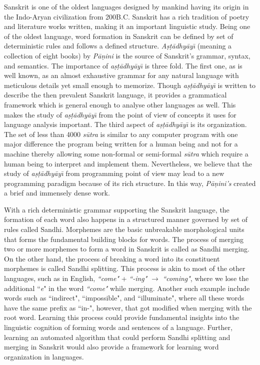 \documentclass[11pt]{article}
\begin{document}
Sanskrit is one of the oldest languages designed by mankind having its origin in the Indo-Aryan civilization from 200B.C. Sanskrit has a rich tradition of poetry and literature works written, making it an important linguistic study. Being one of the oldest language, word formation in Sanskrit can be defined by set of deterministic rules and follows a defined structure. \textit{A\d{s}\d{t}\={a}dhy\={a}y\={\i}} (meaning a collection of eight books) by \textit{P\={a}\d{n}ini} is the source of Sanskrit's grammar, syntax, and semantics. The importance of \textit{a\d{s}\d{t}\={a}dhy\={a}y\={\i}} is three fold\cite{bharati2007}. The first one, as is well known, as an almost exhaustive grammar for any natural language with meticulous details yet small enough to memorize. Though \textit{a\d{s}\d{t}\={a}dhy\={a}y\={\i}} is written to describe the then prevalent Sanskrit language, it provides a grammatical framework which is general enough to analyse other languages as well. This makes the study of \textit{a\d{s}\d{t}\={a}dhy\={a}y\={\i}} from the point of view of concepts it uses for language analysis important. The third aspect of \textit{a\d{s}\d{t}\={a}dhy\={a}y\={\i}} is its organization. The set of less than 4000 \textit{s\={u}tra} is similar to any computer program with one major difference the program being written for a human being and not for a machine thereby allowing some non-formal or semi-formal \textit{s\={u}tra} which require a human being to interpret and implement them. Nevertheless, we believe that the study of \textit{a\d{s}\d{t}\={a}dhy\={a}y\={\i}} from programming point of view may lead to a new programming paradigm because of its rich structure. In this way, 	\textit{P\={a}\d{n}ini's} created a brief and immensely dense work. 

With a rich deterministic grammar supporting the Sanskrit language, the formation of each word also happens in a structured manner governed by set of rules called Sandhi. Morphemes are the basic unbreakable morphological units that forms the fundamental building blocks for words. The process of merging two or more morphemes to form a word in Sanskrit is called as Sandhi merging. On the other hand, the process of breaking a word into its constituent morphemes is called Sandhi splitting. This process is akin to most of the other languages, such as in English, \textit{``come"} + \textit{``-ing"} $\rightarrow$ \textit{``coming"}, where we lose the additional ``\textit{e}" in the word \textit{``come"} while merging. Another such example include words such as ``indirect", ``impossible", and ``illuminate", where all these words have the same prefix as ``in-", however, that got modified when merging with the root word. Learning this process could provide fundamental insights into the linguistic cognition of forming words and sentences of a language. Further, learning an automated algorithm that could perform Sandhi splitting and merging in Sanskrit would also provide a framework for learning word organization in languages.
\end{document}
